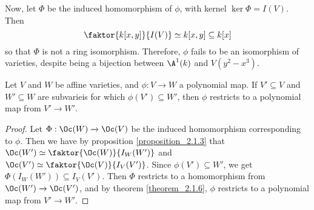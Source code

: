 \begin{example}
\begin{enumerate}
      Now, let $\Phi$ be the induced homomorphism of $\phi$, with kernel
      $\ker{\Phi}=I(V)$. Then
      \begin{equation*}
        \faktor{k[x,y]}{I(V)} \simeq k[x,y] \subseteq k[x]
      \end{equation*}
      so that $\Phi$ is not a ring isomorphism. Therefore, $\phi$ fails to be an
      isomorphism of varieties, despite being a bijection between $\A^1(k)$ and
      $V(y^2-x^3)$.
  \end{enumerate}
\end{example}

\begin{proposition}\label{proposition_2.1.10}
  Let $V$ and  $W$ be affine varieties, and  $\phi:V \xrightarrow{} W$ a
  polynomial map. If $V' \subseteq V$ and $W' \subseteq W$ are subvarieis for
  which $\phi(V') \subseteq W'$, then $\phi$ restricts to a polynomial map from
   $V' \xrightarrow{} W'$.
\end{proposition}
\begin{proof}
  Let $\Phi:\Oc(W) \xrightarrow{} \Oc(V)$ be the induced homomorphism
  corresponding to $\phi$. Then we have by proposition \ref{proposition_2.1.3} that
  $\Oc(W') \simeq \faktor{\Oc(W)}{I_W(W')}$ and $\Oc(V') \simeq
  \faktor{\Oc(V)}{I_V(V')}$. Since $\phi(V') \subseteq W'$, we get
  $\Phi(I_W(W')) \subseteq I_V(V')$. Then $\Phi$ restricts to a homomorphism
  from $\Oc(W') \xrightarrow{} \Oc(V')$, and by theorem \ref{theorem_2.1.6},
  $\phi$ restricts to a polynomial map from  $V' \xrightarrow{} W'$.
\end{proof}

